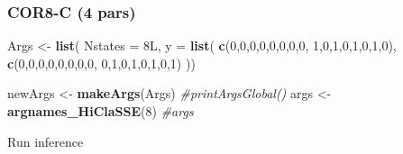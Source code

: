 \documentclass[
]{article}
\newenvironment{Shaded}{\begin{snugshade}}{\end{snugshade}}
\newcommand{\AttributeTok}[1]{\textcolor[rgb]{0.13,0.29,0.53}{#1}}
\newcommand{\CommentTok}[1]{\textcolor[rgb]{0.56,0.35,0.01}{\textit{#1}}}
\newcommand{\DecValTok}[1]{\textcolor[rgb]{0.00,0.00,0.81}{#1}}
\newcommand{\FunctionTok}[1]{\textcolor[rgb]{0.13,0.29,0.53}{\textbf{#1}}}
\newcommand{\NormalTok}[1]{#1}
\newcommand{\OtherTok}[1]{\textcolor[rgb]{0.56,0.35,0.01}{#1}}
\begin{document}
\hypertarget{cor8-c-4-pars}{%
\subsubsection{COR8-C (4 pars)}\label{cor8-c-4-pars}}

\begin{Shaded}
\begin{Highlighting}[]
\NormalTok{Args }\OtherTok{\textless{}{-}} \FunctionTok{list}\NormalTok{(}
  \AttributeTok{Nstates =}\NormalTok{ 8L,}
  \AttributeTok{y =} \FunctionTok{list}\NormalTok{(}
    \FunctionTok{c}\NormalTok{(}\DecValTok{0}\NormalTok{,}\DecValTok{0}\NormalTok{,}\DecValTok{0}\NormalTok{,}\DecValTok{0}\NormalTok{,}\DecValTok{0}\NormalTok{,}\DecValTok{0}\NormalTok{,}\DecValTok{0}\NormalTok{,}\DecValTok{0}\NormalTok{, }\DecValTok{1}\NormalTok{,}\DecValTok{0}\NormalTok{,}\DecValTok{1}\NormalTok{,}\DecValTok{0}\NormalTok{,}\DecValTok{1}\NormalTok{,}\DecValTok{0}\NormalTok{,}\DecValTok{1}\NormalTok{,}\DecValTok{0}\NormalTok{),}
    \FunctionTok{c}\NormalTok{(}\DecValTok{0}\NormalTok{,}\DecValTok{0}\NormalTok{,}\DecValTok{0}\NormalTok{,}\DecValTok{0}\NormalTok{,}\DecValTok{0}\NormalTok{,}\DecValTok{0}\NormalTok{,}\DecValTok{0}\NormalTok{,}\DecValTok{0}\NormalTok{, }\DecValTok{0}\NormalTok{,}\DecValTok{1}\NormalTok{,}\DecValTok{0}\NormalTok{,}\DecValTok{1}\NormalTok{,}\DecValTok{0}\NormalTok{,}\DecValTok{1}\NormalTok{,}\DecValTok{0}\NormalTok{,}\DecValTok{1}\NormalTok{)}
\NormalTok{  ))}

\NormalTok{newArgs }\OtherTok{\textless{}{-}} \FunctionTok{makeArgs}\NormalTok{(Args)}
\CommentTok{\#printArgsGlobal()}
\NormalTok{args }\OtherTok{\textless{}{-}} \FunctionTok{argnames\_HiClaSSE}\NormalTok{(}\DecValTok{8}\NormalTok{)}
\CommentTok{\#args}
\end{Highlighting}
\end{Shaded}

Run inference
\end{document}

